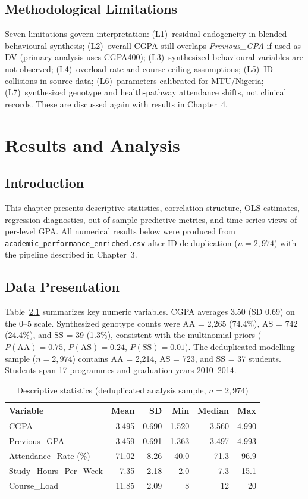 \documentclass[12pt]{report}
\begin{document}
	\section{Methodological Limitations}
	\label{sec:method-limitations}
	Seven limitations govern interpretation: (L1)~residual endogeneity in blended behavioural synthesis; (L2)~overall CGPA still overlaps \textit{Previous\_GPA} if used as DV (primary analysis uses CGPA400); (L3)~synthesized behavioural variables are not observed; (L4)~overload rate and course ceiling assumptions; (L5)~ID collisions in source data; (L6)~parameters calibrated for MTU/Nigeria; (L7)~synthesized genotype and health-pathway attendance shifts, not clinical records. These are discussed again with results in Chapter~4.
	
	\chapter{Results and Analysis}
	
	\section{Introduction}
	This chapter presents descriptive statistics, correlation structure, OLS estimates, regression diagnostics, out-of-sample predictive metrics, and time-series views of per-level GPA. All numerical results below were produced from \texttt{academic\_performance\_enriched.csv} after ID de-duplication ($n = 2{,}974$) with the pipeline described in Chapter~3.
	
	\section{Data Presentation}
	Table~\ref{tab:descriptive} summarizes key numeric variables. CGPA averages 3.50 (SD 0.69) on the 0--5 scale. Synthesized genotype counts were AA = 2,265 (74.4\%), AS = 742 (24.4\%), and SS = 39 (1.3\%), consistent with the multinomial priors ($P(\text{AA})=0.75$, $P(\text{AS})=0.24$, $P(\text{SS})=0.01$). The deduplicated modelling sample ($n = 2{,}974$) contains AA = 2,214, AS = 723, and SS = 37 students. Students span 17 programmes and graduation years 2010--2014.
	
	\begin{table}[htbp]
		\centering
		\caption{Descriptive statistics (deduplicated analysis sample, $n = 2{,}974$)}
		\label{tab:descriptive}
		\begin{tabular}{lrrrrr}
			\hline
			Variable & Mean & SD & Min & Median & Max \\
			\hline
			CGPA & 3.495 & 0.690 & 1.520 & 3.560 & 4.990 \\
			Previous\_GPA & 3.459 & 0.691 & 1.363 & 3.497 & 4.993 \\
			Attendance\_Rate (\%) & 71.02 & 8.26 & 40.0 & 71.3 & 96.9 \\
			Study\_Hours\_Per\_Week & 7.35 & 2.18 & 2.0 & 7.3 & 15.1 \\
			Course\_Load & 11.85 & 2.09 & 8 & 12 & 20 \\
			\hline
		\end{tabular}
	\end{table}
	
\end{document}
